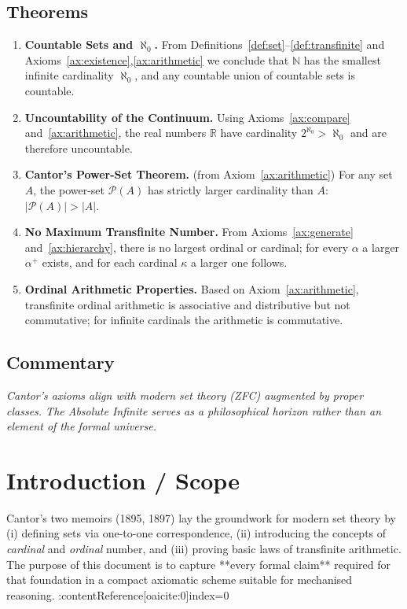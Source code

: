 \documentclass[11pt]{article}
\begin{document}
\subsection*{Theorems}
\begin{enumerate}
  \item \textbf{Countable Sets and $\aleph_0$.} From Definitions~\ref{def:set}--\ref{def:transfinite} and Axioms~\ref{ax:existence},\ref{ax:arithmetic} we conclude that $\mathbb{N}$ has the smallest infinite cardinality $\aleph_0$, and any countable union of countable sets is countable.\label{thm:countable}
  \item \textbf{Uncountability of the Continuum.} Using Axioms~\ref{ax:compare} and~\ref{ax:arithmetic}, the real numbers $\mathbb{R}$ have cardinality $2^{\aleph_0}>\aleph_0$ and are therefore uncountable.\label{thm:continuum}
  \item \textbf{Cantor's Power-Set Theorem.} (from Axiom~\ref{ax:arithmetic}) For any set $A$, the power-set $\mathcal{P}(A)$ has strictly larger cardinality than $A$: $|\mathcal{P}(A)|>|A|$.\label{thm:powerset}
  \item \textbf{No Maximum Transfinite Number.} From Axioms~\ref{ax:generate} and~\ref{ax:hierarchy}, there is no largest ordinal or cardinal; for every $\alpha$ a larger $\alpha^+$ exists, and for each cardinal $\kappa$ a larger one follows.\label{thm:nomax}
  \item \textbf{Ordinal Arithmetic Properties.} Based on Axiom~\ref{ax:arithmetic}, transfinite ordinal arithmetic is associative and distributive but not commutative; for infinite cardinals the arithmetic is commutative.\label{thm:arith}
\end{enumerate}

\subsection*{Commentary}
\textit{Cantor's axioms align with modern set theory (ZFC) augmented by proper classes. The Absolute Infinite serves as a philosophical horizon rather than an element of the formal universe.}


\section*{Introduction / Scope}
Cantor’s two memoirs (1895, 1897) lay the groundwork for modern set
theory by (i) defining sets via one-to-one correspondence, (ii) introducing
the concepts of \emph{cardinal} and \emph{ordinal} number, and
(iii) proving basic laws of transfinite arithmetic.  The purpose of this
document is to capture **every formal claim** required for that
foundation in a compact axiomatic scheme suitable for mechanised
reasoning. :contentReference[oaicite:0]{index=0}
\end{document}

